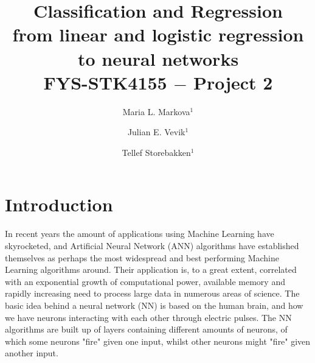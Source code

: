 \documentclass{emulateapj}
\begin{document}
\title{Classification and Regression\\
from linear and logistic regression to neural networks\\
FYS-STK4155 $-$ Project 2}

\author{Maria L. Markova$^1$}

\author{Julian E. Vevik$^1$}

\author{Tellef Storebakken$^1$}





\begin{abstract}

\end{abstract}


\section{Introduction}
\label{sec: introduction}
In recent years the amount of applications using Machine Learning have skyrocketed, and Artificial Neural Network (ANN) algorithms have established themselves as perhaps the most widespread and best performing Machine Learning algorithms around. Their application is, to a great extent, correlated with an exponential growth of computational power, available memory and rapidly increasing need to process large data in numerous areas of science. The basic idea behind a neural network (NN) is based on the human brain, and how we have neurons interacting with each other through electric pulses. The NN algorithms are built up of layers containing different amounts of neurons, of which some neurons "fire" given one input, whilst other neurons might "fire" given another input.  
\end{document}

